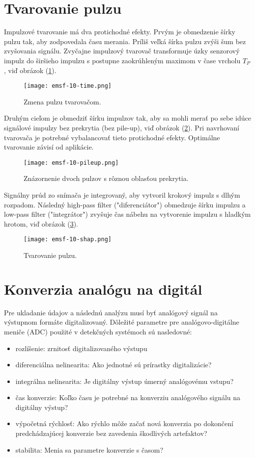 \documentclass[../../main.tex]{subfiles}
\begin{document}
\section{Tvarovanie pulzu}
Impulzové tvarovanie má dva protichodné efekty. Prvým je obmedzenie šírky pulzu tak, aby zodpovedala času merania. Príliš veľká šírka pulzu zvýši šum bez zvyšovania signálu. Zvyčajne impulzový tvarovač transformuje úzky senzorový impulz do širšieho impulzu s postupne zaokrúhleným maximom v čase vrcholu $T_P$, viď obrázok (\ref{em10:fig:time}).

\begin{figure}[!h]
\texttt{[image: emsf-10-time.png]}
\centering
\caption{Zmena pulzu tvarovačom.}
\label{em10:fig:time}
\end{figure}

Druhým cieľom je obmedziť šírku impulzov tak, aby sa mohli merať po sebe idúce signálové impulzy bez prekrytia (bez pile-up), viď obrázok (\ref{em10:fig:pileup}). Pri navrhovaní tvarovača je potrebné vybalancovať tieto protichodné efekty. Optimálne tvarovanie závisí od aplikácie.

\begin{figure}[!h]
\texttt{[image: emsf-10-pileup.png]}
\centering
\caption{Znázornenie dvoch pulzov s rôznou oblasťou prekrytia.}
\label{em10:fig:pileup}
\end{figure} 

Signálny prúd zo snímača je integrovaný, aby vytvoril krokový impulz s dlhým rozpadom. Následný high-pass filter ("diferenciátor") obmedzuje šírku impulzu a low-pass filter ("integrátor") zvyšuje čas nábehu na vytvorenie impulzu s hladkým hrotom, viď obrázok (\ref{em10:fig:shaping}).

\begin{figure}[!h]
\texttt{[image: emsf-10-shap.png]}
\centering
\caption{Tvarovanie pulzu.}
\label{em10:fig:shaping}
\end{figure}

\section{Konverzia analógu na digitál}
Pre ukladanie údajov a následnú analýzu musí byť analógový signál na výstupnom formáte digitalizovaný. Dôležité parametre pre analógovo-digitálne meniče (ADC) použité v detekčných systémoch sú nasledovné:
\begin{itemize}
\item rozlíšenie: zrnitosť digitalizovaného výstupu
\item diferenciálna nelinearita: Ako jednotné sú prírastky digitalizácie?
\item integrálna nelinearita: Je digitálny výstup úmerný analógovému vstupu?
\item čas konverzie: Koľko času je potrebné na konverziu analógového signálu na digitálny výstup?
\item výpočetná rýchlosť: Ako rýchlo môže začať nová konverzia po dokončení predchádzajúcej konverzie bez zavedenia škodlivých artefaktov?
\item stabilita: Menia sa parametre konverzie s časom?
\end{itemize}
\end{document}
